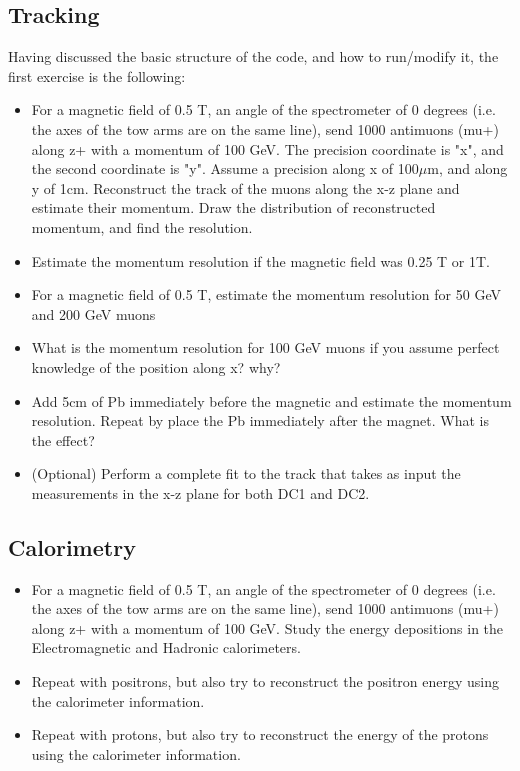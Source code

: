 \documentclass[a4paper,11pt,twoside]{article}
\begin{document}
\subsection{Tracking}
Having discussed the basic structure of the code, and how to run/modify it, the first exercise is the following:
\begin{itemize}
\item For a magnetic field of 0.5 T, an angle of the spectrometer of 0 degrees (i.e. the axes of the tow arms are on the same line), send 1000 antimuons (mu+) along z+ with a momentum of 100 GeV. The precision coordinate is "x", and the second coordinate is "y". Assume a precision along x of 100$\mu$m, and along y of 1cm. Reconstruct the track of the muons along the x-z plane and estimate their momentum. Draw the distribution of reconstructed momentum, and find the resolution.
\item Estimate the momentum resolution if the magnetic field was 0.25 T or 1T.
\item For a magnetic field of 0.5 T, estimate the momentum resolution for 50 GeV and 200 GeV muons 
\item What is the momentum resolution for 100 GeV muons if you assume perfect knowledge of the position along x? why?
\item Add 5cm of Pb immediately before the magnetic and estimate the momentum resolution. Repeat by place the Pb immediately after the magnet. What is the effect?
\item (Optional) Perform a complete fit to the track that takes as input the measurements in the x-z plane for both DC1 and DC2. 
\end{itemize}

\subsection{Calorimetry}
\begin{itemize}
    \item For a magnetic field of 0.5 T, an angle of the spectrometer of 0 degrees (i.e. the axes of the tow arms are on the same line), send 1000 antimuons (mu+) along z+ with a momentum of 100 GeV. Study the energy depositions in the Electromagnetic and Hadronic calorimeters. 
\item Repeat with positrons, but also try to reconstruct the positron energy using the calorimeter information.
\item Repeat with protons, but also try to reconstruct the energy of the protons using the calorimeter information.
\end{itemize}
\end{document}
